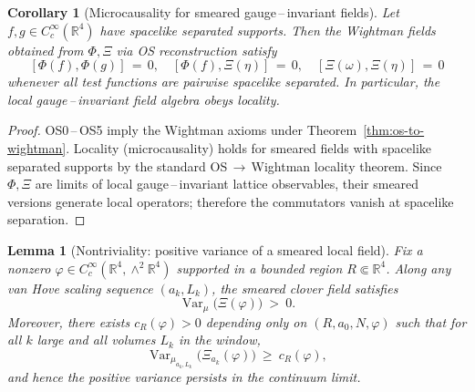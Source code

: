 \documentclass[11pt]{amsart}
\theoremstyle{plain}
\newtheorem{lemma}[theorem]{Lemma}
\newtheorem{corollary}[theorem]{Corollary}
\theoremstyle{definition}
\theoremstyle{remark}
\begin{document}
\begin{corollary}[Microcausality for smeared gauge\,–\,invariant fields]
\label{cor:microcausality}
Let $f,g\in C_c^\infty(\mathbb R^4)$ have spacelike separated supports. Then the Wightman fields obtained from $\Phi,\Xi$ via OS reconstruction satisfy
\[
  [\Phi(f),\Phi(g)]\,=\,0,\quad [\Phi(f),\Xi(\eta)]\,=\,0,\quad [\Xi(\omega),\Xi(\eta)]\,=\,0
\]
whenever all test functions are pairwise spacelike separated. In particular, the local gauge\,–\,invariant field algebra obeys locality.
\end{corollary}

\begin{proof}
OS0\,–\,OS5 imply the Wightman axioms under Theorem~\ref{thm:os-to-wightman}. Locality (microcausality) holds for smeared fields with spacelike separated supports by the standard OS\,$\to$\,Wightman locality theorem. Since $\Phi,\Xi$ are limits of local gauge\,–\,invariant lattice observables, their smeared versions generate local operators; therefore the commutators vanish at spacelike separation.
\end{proof}

\begin{lemma}[Nontriviality: positive variance of a smeared local field]\label{lem:nontrivial-variance}
Fix a nonzero $\varphi\in C_c^\infty(\mathbb R^4,\wedge^2\mathbb R^4)$ supported in a bounded region $R\Subset\mathbb R^4$. Along any van Hove scaling sequence $(a_k,L_k)$, the smeared clover field satisfies
\[
  \operatorname{Var}_\mu\big(\Xi(\varphi)\big)\ >\ 0.
\]
Moreover, there exists $c_R(\varphi)>0$ depending only on $(R,a_0,N,\varphi)$ such that for all $k$ large and all volumes $L_k$ in the window,
\[
  \operatorname{Var}_{\mu_{a_k,L_k}}\big(\Xi_{a_k}(\varphi)\big)\ \ge\ c_R(\varphi),
\]
and hence the positive variance persists in the continuum limit.
\end{lemma}
\end{document}
